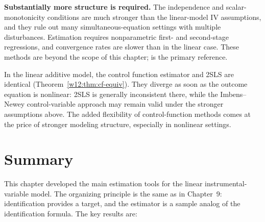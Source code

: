 \documentclass[master.tex]{subfiles}
\begin{document}
\textbf{Substantially more structure is required.}  The independence
and scalar-monotonicity conditions are much stronger than the linear-model
IV assumptions, and they rule out many simultaneous-equation settings
with multiple disturbances.  Estimation requires nonparametric
first- and second-stage regressions, and convergence rates are slower
than in the linear case.  These methods are beyond the scope of this
chapter; \citet{imbens2009} is the primary reference.

\begin{remark}
In the linear additive model, the control function estimator and 2SLS
are identical (Theorem~\ref{w12:thm:cf-equiv}).  They diverge as soon as
the outcome equation is nonlinear: 2SLS is generally inconsistent there,
while the Imbens--Newey control-variable approach may remain valid under
the stronger assumptions above.  The added flexibility of control-function
methods comes at the price of stronger modeling structure, especially in
nonlinear settings.
\end{remark}



\section{Summary}
\label{w12:sec:summary}
This chapter developed the main estimation tools for the linear
instrumental-variable model.  The organizing principle is the same as
in Chapter~9: identification provides a target, and the estimator is
a sample analog of the identification formula.  The key results are:
\end{document}
